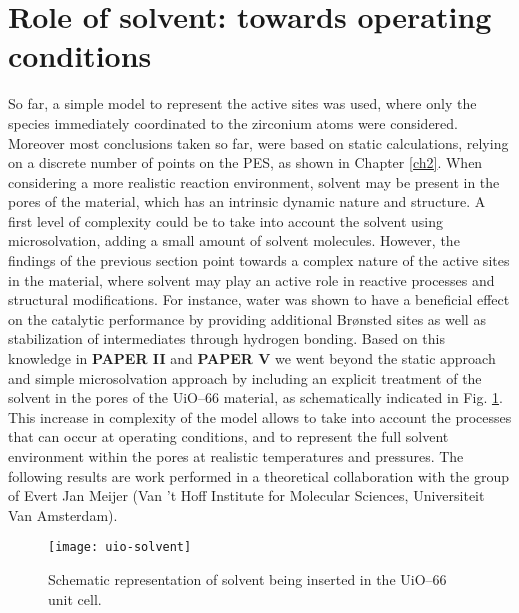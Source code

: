 \section{Role of solvent: towards operating conditions}
So far, a simple model to represent the active sites was used, where only the species immediately coordinated to the zirconium atoms were considered. Moreover most conclusions taken so far, were based on static calculations, relying on a discrete number of points on the PES, as shown in Chapter \ref{ch2}.  When considering a more realistic reaction environment, solvent may be present in the pores of the material, which has an intrinsic dynamic nature and structure. A first level of complexity could be to take into account the solvent using microsolvation, adding a small amount of solvent molecules. However, the findings of the previous section point towards a complex nature of the active sites in the material, where solvent may play an active role in reactive processes and structural modifications. 
For instance, water was shown to have a beneficial effect on the catalytic performance by providing additional Br\o{}nsted sites as well as stabilization of intermediates through hydrogen bonding. Based on this knowledge in \textbf{PAPER II} and \textbf{PAPER V} we went beyond the static approach and simple microsolvation approach by including an explicit treatment of the solvent in the pores of the UiO--66 material, as schematically indicated in Fig. \ref{fig:uio-solvent}. This increase in complexity of the model allows to take into account the processes that can occur at operating conditions, and to represent the full solvent environment within the pores at realistic temperatures and pressures. The following results are work performed in a theoretical collaboration with the group of Evert Jan Meijer (Van 't Hoff Institute for Molecular Sciences, Universiteit Van Amsterdam).

\begin{figure}[!htbp]
	\centering
	\texttt{[image: uio-solvent]}
	\caption{Schematic representation of solvent being inserted in the UiO--66 unit cell.}
	\label{fig:uio-solvent}
\end{figure}

